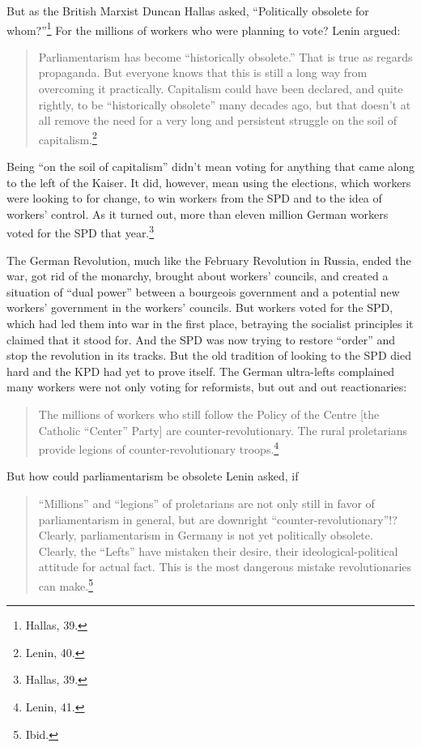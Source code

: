 But as the British Marxist Duncan Hallas asked, ``Politically obsolete for whom?''\footnote{Hallas, 39.} For the millions of workers who were planning to vote? Lenin argued:

\blockquote{Parliamentarism has become ``historically obsolete.'' That is true as regards propaganda. But everyone knows that this is still a long way from overcoming it practically. Capitalism could have been declared, and quite rightly, to be ``historically obsolete'' many decades ago, but that doesn't at all remove the need for a very long and persistent struggle on the soil of capitalism.\footnote{Lenin, 40.}}

Being ``on the soil of capitalism'' didn't mean voting for anything that came along to the left of the Kaiser. It did, however, mean using the elections, which workers were looking to for change, to win workers from the SPD and to the idea of workers' control. As it turned out, more than eleven million German workers voted for the SPD that year.\footnote{Hallas, 39.}

The German Revolution, much like the February Revolution in Russia, ended the war, got rid of the monarchy, brought about workers' councils, and created a situation of ``dual power'' between a bourgeois government and a potential new workers' government in the workers' councils. But workers voted for the SPD, which had led them into war in the first place, betraying the socialist principles it claimed that it stood for. And the SPD was now trying to restore ``order'' and stop the revolution in its tracks. But the old tradition of looking to the SPD died hard and the KPD had yet to prove itself. The German ultra-lefts complained many workers were not only voting for reformists, but out and out reactionaries:

\blockquote{The millions of workers who still follow the Policy of the Centre [the Catholic ``Center'' Party] are counter-revolutionary. The rural proletarians provide legions of counter-revolutionary troops.\footnote{Lenin, 41.}}

But how could parliamentarism be obsolete Lenin asked, if

\blockquote{``Millions'' and ``legions'' of proletarians are not only still in favor of parliamentarism in general, but are downright ``counter-revolutionary''!? Clearly, parliamentarism in Germany is not yet politically obsolete. Clearly, the ``Lefts'' have mistaken their desire, their ideological-political attitude for actual fact. This is the most dangerous mistake revolutionaries can make.\footnote{Ibid.}}

